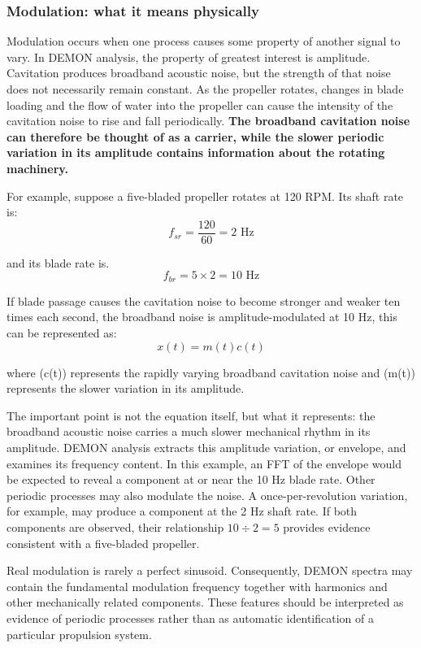 \subsubsection{Modulation: what it means physically}

Modulation occurs when one process causes some property of another signal to vary. In DEMON analysis, the property of greatest interest is amplitude. Cavitation produces broadband acoustic noise, but the strength of that noise does not necessarily remain constant. As the propeller rotates, changes in blade loading and the flow of water into the propeller can cause the intensity of the cavitation noise to rise and fall periodically. \textbf{The broadband cavitation noise can therefore be thought of as a carrier, while the slower periodic variation in its amplitude contains information about the rotating machinery.}

For example, suppose a five-bladed propeller rotates at 120 RPM. Its shaft rate is:
\[
    f_{sr}=\frac{120}{60}=2\text{ Hz}
\]

and its blade rate is.
\[
    f_{br}=5\times2=10\text{ Hz}
\]

If blade passage causes the cavitation noise to become stronger and weaker ten times each second, the broadband noise is amplitude-modulated at 10 Hz, this can be represented as:
\[
    x(t)=m(t)c(t)   
\]

where (c(t)) represents the rapidly varying broadband cavitation noise and (m(t)) represents the slower variation in its amplitude.

The important point is not the equation itself, but what it represents: the broadband acoustic noise carries a much slower mechanical rhythm in its amplitude. DEMON analysis extracts this amplitude variation, or envelope, and examines its frequency content. In this example, an FFT of the envelope would be expected to reveal a component at or near the 10 Hz blade rate. Other periodic processes may also modulate the noise. A once-per-revolution variation, for example, may produce a component at the 2 Hz shaft rate. If both components are observed, their relationship $10 \div 2 = 5$ provides evidence consistent with a five-bladed propeller.

Real modulation is rarely a perfect sinusoid. Consequently, DEMON spectra may contain the fundamental modulation frequency together with harmonics and other mechanically related components. These features should be interpreted as evidence of periodic processes rather than as automatic identification of a particular propulsion system.

